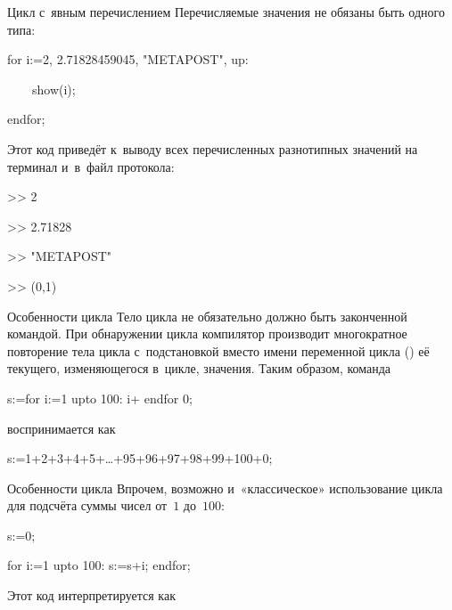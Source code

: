 \begin{frame}{Цикл  с~явным перечислением}
Перечисляемые значения не обязаны быть одного типа:
\begin{programlisting}
for i:=2, 2.71828459045, "METAPOST", up:\par
~~~~show(i);\par
endfor;
\end{programlisting}

Этот код приведёт к~выводу всех перечисленных разнотипных значений на терминал
и~в~файл протокола:
\begin{screen}%
>> 2\par
>> 2.71828\par
>> "METAPOST"\par
>> (0,1)
\end{screen}
\end{frame}

\begin{frame}{Особенности цикла }
Тело цикла  не обязательно должно быть законченной командой. При
обнаружении цикла  компилятор  производит
многократное повторение тела цикла с~подстановкой вместо имени переменной цикла
() её текущего, изменяющегося в~цикле, значения. Таким образом,
команда
\begin{programlisting}
s:=for i:=1 upto 100: \alert{i+} endfor 0;
\end{programlisting}
воспринимается как
\begin{programlisting}
s:=\alert{1+2+3+4+5+…+95+96+97+98+99+100+}0;
\end{programlisting}
\end{frame}

\begin{frame}{Особенности цикла }
Впрочем, возможно и~«классическое» использование цикла для подсчёта суммы чисел
от~$1$ до~$100$:
\begin{programlisting}%
s:=0;\par
for i:=1 upto 100: \alert{s:=s+i;} endfor;
\end{programlisting}
Этот код интерпретируется как
\end{frame}

